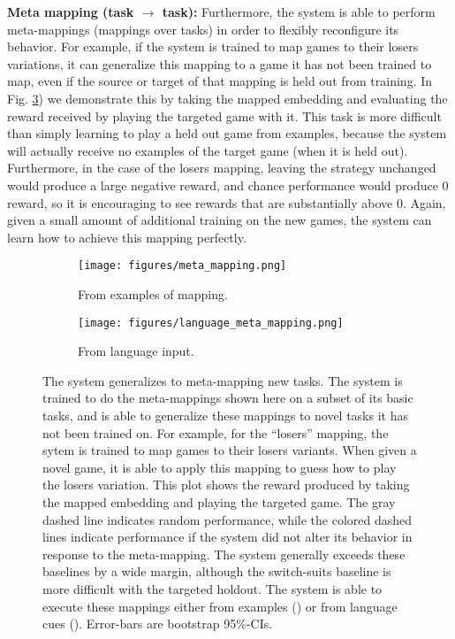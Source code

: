 \documentclass{article}
\begin{document}
\textbf{Meta mapping (task $\rightarrow$ task):} Furthermore, the system is able to perform meta-mappings (mappings over tasks) in order to flexibly reconfigure its behavior. For example, if the system is trained to map games to their losers variations, it can generalize this mapping to a game it has not been trained to map, even if the source or target of that mapping is held out from training. In Fig. \ref{cards_meta_map_results}) we demonstrate this by taking the mapped embedding and evaluating the reward received by playing the targeted game with it. This task is more difficult than simply learning to play a held out game from examples, because the system will actually receive no examples of the target game (when it is held out). Furthermore, in the case of the losers mapping, leaving the strategy unchanged would produce a large negative reward, and chance performance would produce 0 reward, so it is encouraging to see rewards that are substantially above 0. Again, given a small amount of additional training on the new games, the system can learn how to achieve this mapping perfectly. \par
\begin{figure}
\centering
\begin{subfigure}{0.5\textwidth}
\texttt{[image: figures/meta\_mapping.png]}
\caption{From examples of mapping.}
\label{cards_meta_map_results_examples}
\end{subfigure}%
\begin{subfigure}{0.5\textwidth}
\texttt{[image: figures/language\_meta\_mapping.png]}
\caption{From language input.}
\label{cards_meta_map_results_language}
\end{subfigure}
\caption{The system generalizes to meta-mapping new tasks. The system is trained to do the meta-mappings shown here on a subset of its basic tasks, and is able to generalize these mappings to novel tasks it has not been trained on. For example, for the ``losers'' mapping, the sytem is trained to map games to their losers variants. When given a novel game, it is able to apply this mapping to guess how to play the losers variation. This plot shows the reward produced by taking the mapped embedding and playing the targeted game. The gray dashed line indicates random performance, while the colored dashed lines indicate performance if the system did not alter its behavior in response to the meta-mapping. The system generally exceeds these baselines by a wide margin, although the switch-suits baseline is more difficult with the targeted holdout. The system is able to execute these mappings either from examples () or from language cues (). Error-bars are bootstrap 95\%-CIs.}
\label{cards_meta_map_results}
\end{figure}
\end{document}
